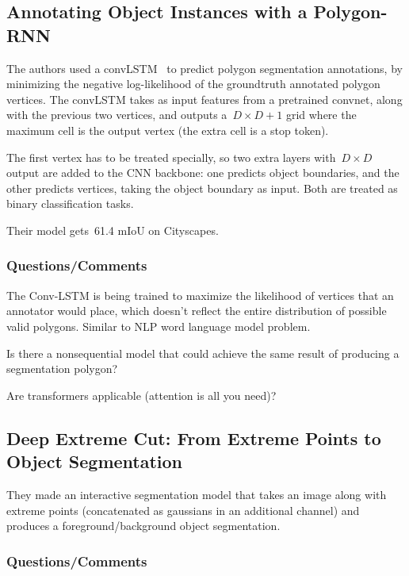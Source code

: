 \documentclass[a4paper, 12pt]{article}
\begin{document}
\subsection{Annotating Object Instances with a
            Polygon-RNN~\cite{castrejon2017annotating}}

The authors used a convLSTM~\cite{shi2015convolutional} to predict polygon
segmentation annotations, by minimizing the negative log-likelihood of the
groundtruth annotated polygon vertices. The convLSTM takes as input features
from a pretrained convnet, along with the previous two vertices, and outputs
a~$D \times D + 1$ grid where the maximum cell is the output vertex (the extra
cell is a stop token).

The first vertex has to be treated specially, so two extra layers
with~$D \times D$ output are added to the CNN backbone: one predicts object
boundaries, and the other predicts vertices, taking the object boundary as
input. Both are treated as binary classification tasks.

Their model gets~\num{61.4} mIoU on Cityscapes.


\subsubsection{Questions/Comments}

The Conv-LSTM is being trained to maximize the likelihood of vertices that an
annotator would place, which doesn't reflect the entire distribution of
possible valid polygons. Similar to NLP word language model problem.

Is there a nonsequential model that could achieve the same result of producing
a segmentation polygon?

Are transformers applicable (attention is all you need)?


\subsection{Deep Extreme Cut: From Extreme Points to Object
            Segmentation~\cite{maninis2018deep}}

They made an interactive segmentation model that takes an image along with
extreme points (concatenated as gaussians in an additional channel) and
produces a foreground/background object segmentation.


\subsubsection{Questions/Comments}
\end{document}
